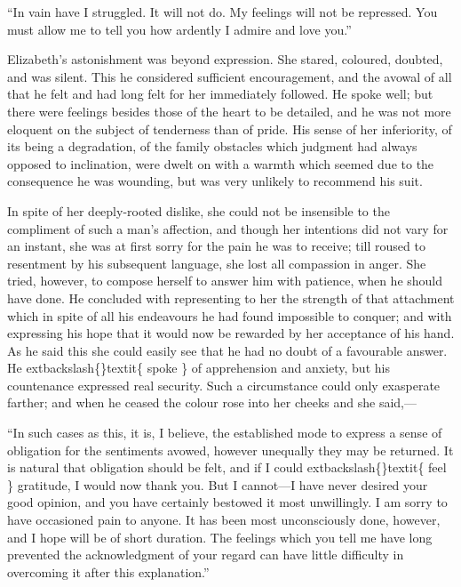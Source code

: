 \documentclass[10pt]{book}
\begin{document}
   “In vain have I struggled. It will not do. My feelings will not be
repressed. You must allow me to tell you how ardently I admire and love
you.”
  

   Elizabeth’s astonishment was beyond expression. She stared, coloured,
doubted, and was silent. This he considered sufficient encouragement,
and the avowal of all that he felt and had long felt for her immediately
followed. He spoke well; but there were feelings besides those of the
heart to be detailed, and he was not more eloquent on the subject of
tenderness than of pride. His sense of her inferiority, of its being a
degradation, of the family obstacles which judgment had always opposed
to inclination, were dwelt on with a warmth which seemed due to the
consequence he was wounding, but was very unlikely to recommend his
suit.
  

   In spite of her deeply-rooted dislike, she could not be insensible to
the compliment of such a man’s affection, and though her intentions did
not vary for an instant, she was at first sorry for the pain he was to
receive; till roused to resentment by his subsequent language, she lost
all compassion in anger. She tried, however, to compose herself to
answer him with patience, when he should have done. He concluded with
representing to her the strength of that attachment which in spite of
all his endeavours he had found impossible to conquer; and with
expressing his hope that it would now be rewarded by her acceptance of
his hand. As he said this she could easily see that he had no doubt of a
favourable answer. He
   	extbackslash\{\}textit\{
    spoke
   \}
   of apprehension and anxiety, but his
countenance expressed real security. Such a circumstance
   could only
exasperate farther; and when he ceased the colour rose into her cheeks
and she said,—
  

   “In such cases as this, it is, I believe, the established mode to
express a sense of obligation for the sentiments avowed, however
unequally they may be returned. It is natural that obligation should be
felt, and if I could
   	extbackslash\{\}textit\{
    feel
   \}
   gratitude, I would now thank you. But I
cannot—I have never desired your good opinion, and you have certainly
bestowed it most unwillingly. I am sorry to have occasioned pain to
anyone. It has been most unconsciously done, however, and I hope will be
of short duration. The feelings which you tell me have long prevented
the acknowledgment of your regard can have little difficulty in
overcoming it after this explanation.”
  
\end{document}

